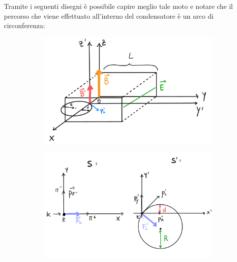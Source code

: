\documentclass[12pt,twoside,a4]{article}
\begin{document}
\begin{solution}
\begin{enumerate}[label=(\textit{\roman*})]
 Tramite i seguenti disegni è possibile capire meglio tale moto e notare che il percorso che viene effettuato all'interno del condensatore è un arco di circonferenza: 
 
 \begin{figure}[h]
\begin{flushright}

	    \begin{minipage}[]{.49\textwidth}
	       \begin{figure}[H]
	        	\flushright
    		    \hspace{-1cm}\includegraphics[height=0.60   \linewidth]{condensatore.pdf}
		        
        \end{figure}

		\end{minipage}
	        \hspace{1mm}%
		\begin{minipage}[]{.49\textwidth}
			\begin{figure}[H]
	        	\flushright
    		    \hspace{-1cm}\includegraphics[height=0.70   \linewidth]{ss.pdf} 
    		    

\end{figure}
\end{minipage}
\end{flushright}
\end{figure}
\end{enumerate}
\end{solution}
\end{document}
